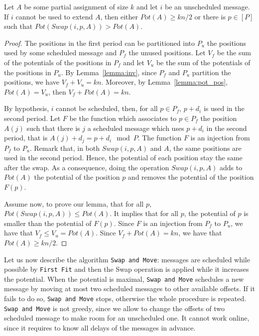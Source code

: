 \documentclass[a4paper,UKenglish,cleveref, autoref, thm-restate]{lipics-v2019}
\newcommand\firstfit{\texttt{First Fit}\xspace}
\newcommand\swapandmove{\texttt{Swap and Move}\xspace}
\begin{document}
\begin{lemma}\label{lemma:swap}
Let $A$ be some partial assignment of size $k$ and let $i$ be an unscheduled message. If $i$ cannot be used to extend $A$, then either $Pot(A) \geq kn/2$ or there is $p \in [P]$ such that $Pot(Swap(i,p,A)) > Pot(A)$.
\end{lemma}

\begin{proof}
The positions in the first period can be partitioned into $P_{u}$ the positions used by some scheduled message and $P_{f}$ the unused positions.
Let $V_f$ be the sum of the potentials of the positions in $P_f$ and let $V_u$ be the sum of the potentials of the positions in $P_u$. By Lemma~\ref{lemma:inv}, since $P_f$ and $P_u$ partition the positions, we have $V_f + V_u = kn$. Moreover, by Lemma~\ref{lemma:pot_pos}, $Pot(A) = V_u$, then $V_f + Pot(A) = kn$.

By hypothesis, $i$ cannot be scheduled, then, for all $p \in P_{f}$, $p+d_i$ is used in the second period. Let $F$ be the function which associates to $p \in P_{f}$ the position $A(j)$ such that there is $j$ a scheduled message which uses $p+d_i$ in the second period, that is $A(j) + d_j = p + d_i \mod P$. The function $F$ is an injection from $P_{f}$ to $P_u$. Remark that, in both $Swap(i,p,A)$ and $A$, the same positions are used in the second period. Hence, the potential of each position stay the same after the swap. As a consequence, doing the operation $Swap(i,p,A)$ adds to $Pot(A)$ the potential of the position $p$ and removes the potential of the position $F(p)$. 

Assume now, to prove our lemma, that for all $p$, $Pot(Swap(i,p,A)) \leq Pot(A)$. It implies that for all $p$, the potential of $p$ is smaller than the potential of $F(p)$. Since $F$ is an injection from $P_f$ to $P_u$, we have that $V_f \leq V_u = Pot(A)$. Since $V_f + Pot(A) = kn$, we have that $Pot(A) \geq kn/2$.
\end{proof}


Let us now describe the algorithm \swapandmove:  messages are scheduled while possible by \firstfit and then the Swap operation is applied while it increases the potential. When the potential is maximal, \swapandmove schedules a new message by moving at most two scheduled messages to other available offsets. If it fails to do so, \swapandmove stops, otherwise the whole procedure is repeated. 
\swapandmove  is not greedy, since we allow to change the offsets of two scheduled message to make room for an unscheduled one. It cannot work online, since it requires to know all delays of the messages in advance. 
\end{document}
